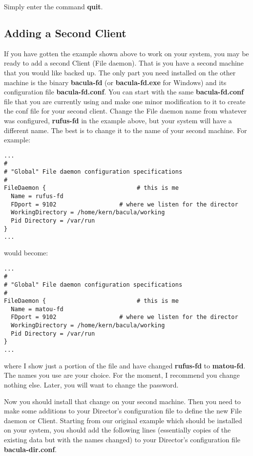 {{Simply enter the command {\bf quit}. 
\label{SecondClient}

\subsection*{Adding a Second Client}

If you have gotten the example shown above to work on your system, you may be
ready to add a second Client (File daemon). That is you have a second machine
that you would like backed up. The only part you need installed on the other
machine is the binary {\bf bacula-fd} (or {\bf bacula-fd.exe} for Windows) and
its configuration file {\bf bacula-fd.conf}. You can start with the same {\bf
bacula-fd.conf} file that you are currently using and make one minor
modification to it to create the conf file for your second client. Change the
File daemon name from whatever was configured, {\bf rufus-fd} in the example
above, but your system will have a different name. The best is to change it to
the name of your second machine. For example: 

\footnotesize
\begin{verbatim}
...
#
# "Global" File daemon configuration specifications
#
FileDaemon {                          # this is me
  Name = rufus-fd
  FDport = 9102                  # where we listen for the director
  WorkingDirectory = /home/kern/bacula/working
  Pid Directory = /var/run
}
...
\end{verbatim}
\normalsize

would become: 

\footnotesize
\begin{verbatim}
...
#
# "Global" File daemon configuration specifications
#
FileDaemon {                          # this is me
  Name = matou-fd
  FDport = 9102                  # where we listen for the director
  WorkingDirectory = /home/kern/bacula/working
  Pid Directory = /var/run
}
...
\end{verbatim}
\normalsize

where I show just a portion of the file and have changed {\bf rufus-fd} to
{\bf matou-fd}. The names you use are your choice. For the moment, I recommend
you change nothing else. Later, you will want to change the password. 

Now you should install that change on your second machine. Then you need to
make some additions to your Director's configuration file to define the new
File daemon or Client. Starting from our original example which should be
installed on your system, you should add the following lines (essentially
copies of the existing data but with the names changed) to your Director's
configuration file {\bf bacula-dir.conf}. 

}}
